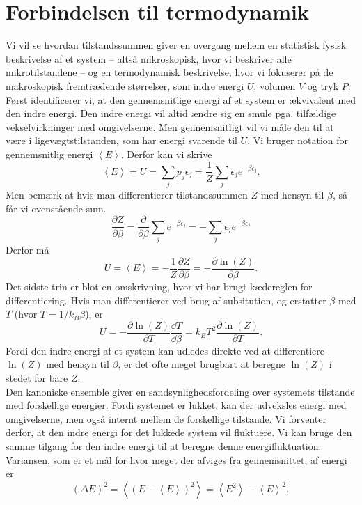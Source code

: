 \section{Forbindelsen til termodynamik}
Vi vil se hvordan tilstandssummen giver en overgang mellem en statistisk fysisk beskrivelse af et system -- altså mikroskopisk, hvor vi beskriver alle mikrotilstandene -- og en termodynamisk beskrivelse, hvor vi fokuserer på de makroskopisk fremtrædende størrelser, som indre energi $U$, volumen $V$ og tryk $P$.\\
Først identificerer vi, at den gennemsnitlige energi af et system er ækvivalent med den indre energi. Den indre energi vil altid ændre sig en smule pga. tilfældige vekselvirkninger med omgivelserne. Men gennemsnitligt vil vi måle den til at være i ligevægtstilstanden, som har energi svarende til $U$. Vi bruger notation for gennemsnitlig energi $\left< E\right>$. Derfor kan vi skrive
\[ \left< E\right>=U=\sum_j p_j\epsilon_j=\frac{1}{Z}\sum_j \epsilon_j e^{-\beta \epsilon_j}. \]
Men bemærk at hvis man differentierer tilstandssummen $Z$ med hensyn til $\beta$, så får vi ovenstående sum.
\[ \frac{\partial Z}{\partial\beta}=\frac{\partial}{\partial\beta}\sum_j e^{-\beta\epsilon_j}=-\sum_j\epsilon_j e^{-\beta\epsilon_j} \]
Derfor må
\[ U=\left< E\right>=-\frac{1}{Z}\frac{\partial Z}{\partial\beta}=-\frac{\partial \ln (Z)}{\partial \beta}. \]
Det sidste trin er blot en omskrivning, hvor vi har brugt kædereglen for differentiering. Hvis man differentierer ved brug af subsitution, og erstatter $\beta$ med $T$ (hvor $T=1/k_B\beta$), er
\[ U=-\frac{\partial\ln (Z)}{\partial T}\frac{\dd T}{\dd \beta}=k_BT^2\frac{\partial \ln (Z)}{\partial T}. \]
Fordi den indre energi af et system kan udledes direkte ved at differentiere $\ln (Z)$ med hensyn til $\beta$, er det ofte meget brugbart at beregne $\ln (Z)$ i stedet for bare $Z$.\\[12pt]
Den kanoniske ensemble giver en sandsynlighedsfordeling over systemets tilstande med forskellige energier. Fordi systemet er lukket, kan der udveksles energi med omgivelserne, men også internt mellem de forskellige tilstande. Vi forventer derfor, at den indre energi for det lukkede system vil fluktuere. Vi kan bruge den samme tilgang for den indre energi til at beregne denne energifluktuation. Variansen, som er et mål for hvor meget der afviges fra gennemsnittet, af energi er
\begin{equation}
    (\Delta E)^2=\left<(E-\left< E\right>)^2\right>=\left< E^2\right>-\left< E\right>^2,
\end{equation}
